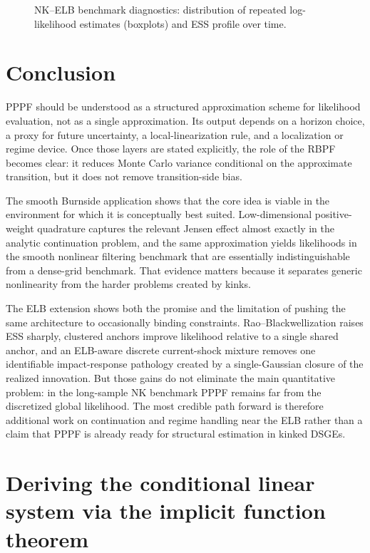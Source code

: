 \documentclass[11pt]{article}
\theoremstyle{remark}
\begin{document}
\begin{figure}[t]
\centering

\caption{NK--ELB benchmark diagnostics: distribution of repeated log-likelihood estimates (boxplots) and ESS profile over time.}
\label{fig:nk_diag}
\end{figure}

\section{Conclusion}

PPPF should be understood as a structured approximation scheme for likelihood evaluation, not as a single approximation.
Its output depends on a horizon choice, a proxy for future uncertainty, a local-linearization rule, and a localization or regime device.
Once those layers are stated explicitly, the role of the RBPF becomes clear: it reduces Monte Carlo variance conditional on the approximate transition, but it does not remove transition-side bias.

The smooth Burnside application shows that the core idea is viable in the environment for which it is conceptually best suited.
Low-dimensional positive-weight quadrature captures the relevant Jensen effect almost exactly in the analytic continuation problem, and the same approximation yields likelihoods in the smooth nonlinear filtering benchmark that are essentially indistinguishable from a dense-grid benchmark.
That evidence matters because it separates generic nonlinearity from the harder problems created by kinks.

The ELB extension shows both the promise and the limitation of pushing the same architecture to occasionally binding constraints.
Rao--Blackwellization raises ESS sharply, clustered anchors improve likelihood relative to a single shared anchor, and an ELB-aware discrete current-shock mixture removes one identifiable impact-response pathology created by a single-Gaussian closure of the realized innovation.
But those gains do not eliminate the main quantitative problem: in the long-sample NK benchmark PPPF remains far from the discretized global likelihood.
The most credible path forward is therefore additional work on continuation and regime handling near the ELB rather than a claim that PPPF is already ready for structural estimation in kinked DSGEs.

\appendix

\section{Deriving the conditional linear system via the implicit function theorem}
\label{app:ift}
\end{document}
